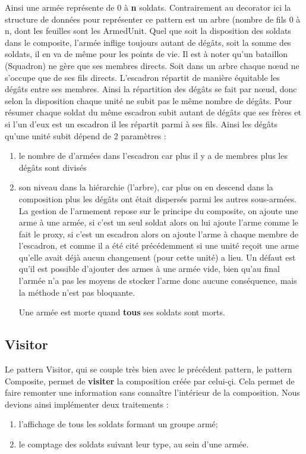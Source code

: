 \documentclass[12pt]{article}
\begin{document}
Ainsi une armée représente de 0 à \textbf{n} soldats.
Contrairement au decorator ici la structure de données pour représenter ce pattern
est un arbre (nombre de fils 0 à n, dont les feuilles sont les ArmedUnit.
Quel que soit la disposition des soldats dans le composite, l'armée inflige 
toujours autant de dégâts, soit la somme des soldats, il en va de même pour les 
points de vie.
Il est à noter qu'un bataillon (Squadron) ne gère que ses membres directs.
Soit dans un arbre chaque nœud ne s'occupe que de ses fils directs.
L'escadron répartit de manière équitable les dégâts entre ses membres.
Ainsi la répartition des dégâts se fait par nœud, donc selon la disposition
chaque unité ne subit pas le même nombre de dégâts.
Pour résumer chaque soldat du même escadron subit autant de dégâts que
ses frères et si l'un d'eux est un escadron il les répartit parmi à ses
fils.
Ainsi les dégâts qu'une unité subit dépend de 2 paramètres :
\begin{enumerate}
\item le nombre de d'armées dans l'escadron car plus il y a de membres plus
les dégâts sont divisés
\item son niveau dans la hiérarchie (l'arbre), car plus on en descend dans la
composition plus les dégâts ont était dispersés parmi les autres sous-armées.\\
La gestion de l'armement repose sur le principe du composite, on ajoute une arme
à une armée, si c'est un seul soldat alors on lui ajoute l'arme comme le fait le
proxy, si c'est un escadron alors on ajoute l'arme à chaque membre de l'escadron,
et comme il a été cité précédemment si une unité reçoit une arme qu'elle avait
déjà aucun changement (pour cette unité) a lieu.
Un défaut est qu'il est possible d'ajouter des armes à une armée vide,
bien qu'au final l'armée n'a pas les moyens de stocker l'arme donc aucune 
conséquence, mais la méthode n'est pas bloquante.

Une armée est morte quand \textbf{tous} ses soldats sont morts.
\end{enumerate}
\subsection{Visitor}
Le pattern Visitor, qui se couple très bien avec le précédent pattern, le pattern 
Composite, permet de \textbf{visiter} la composition créée par celui-çi. Cela 
permet de faire remonter une information sans connaître l'intérieur de la 
composition.
Nous devions ainsi implémenter deux traitements :
\begin{enumerate}
 \item l'affichage de tous les soldats formant un groupe armé;
 \item le comptage des soldats suivant leur type, au sein d'une armée.
\end{enumerate}
\end{document}
